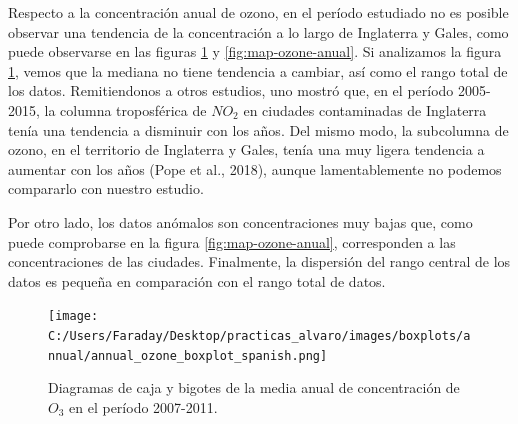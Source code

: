 \documentclass[12pt]{article}
\begin{document}
Respecto a la concentración anual de ozono, en el período estudiado no es posible observar una tendencia de la concentración a lo largo de Inglaterra y Gales, como puede observarse en las figuras \ref{fig:box_ozone_annual} y \ref{fig:map-ozone-anual}. Si analizamos la figura \ref{fig:box_ozone_annual}, vemos que la mediana no tiene tendencia a cambiar, así como el rango total de los datos. Remitiendonos a otros estudios, uno mostró que, en el período 2005-2015, la columna troposférica de $NO_{2}$ en ciudades contaminadas de Inglaterra tenía una tendencia a disminuir con los años. Del mismo modo, la subcolumna de ozono, en el territorio de Inglaterra y Gales, tenía una muy ligera tendencia a aumentar con los años (Pope et al., 2018), aunque lamentablemente no podemos compararlo con nuestro estudio.

Por otro lado, los datos anómalos son concentraciones muy bajas que, como puede comprobarse en la figura \ref{fig:map-ozone-anual}, corresponden a las concentraciones de las ciudades. Finalmente, la dispersión del rango central de los datos es pequeña en comparación con el rango total de datos.

\begin{figure}[H]
\centering
\texttt{[image: C:/Users/Faraday/Desktop/practicas\_alvaro/images/boxplots/annual/annual\_ozone\_boxplot\_spanish.png]}
\caption{Diagramas de caja y bigotes de la media anual de concentración de $O_{3}$ en el período 2007-2011.}
\label{fig:box_ozone_annual}
\end{figure}
\end{document}

